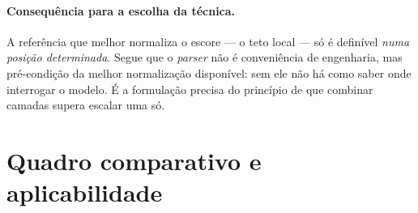 \documentclass[11pt,a4paper]{article}
\begin{document}
\paragraph{Consequência para a escolha da técnica.} A referência que melhor normaliza o escore --- o
teto local --- só é definível \emph{numa posição determinada}. Segue que o \textit{parser} não é
conveniência de engenharia, mas pré-condição da melhor normalização disponível: sem ele não há como
saber onde interrogar o modelo. É a formulação precisa do princípio de que combinar camadas supera
escalar uma só.

\section{Quadro comparativo e aplicabilidade}
\end{document}
